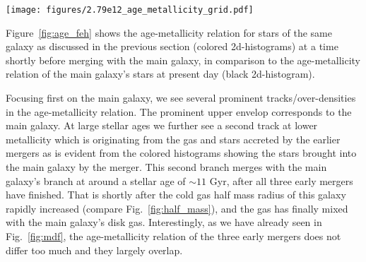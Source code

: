 \documentclass[useAMS,usenatbib]{mnras}
\begin{document}
\begin{figure*}
    \begin{centering}
        \texttt{[image: figures/2.79e12\_age\_metallicity\_grid.pdf]}
        \vspace*{-1.75em}
        \caption{
            Age-metallicity relation for the stars in the galaxy g2.79e12 (black histogram in the background). Individual panels show with color where the stars contributed by the merging dwarf galaxies reside in age-metallicity space. The panel titles highlight the cosmic time at which the merger happens, with two different mergers happening at $t = 2.57$ Gyr.
        }
        \label{fig:age_feh}
    \end{centering}
\end{figure*}

Figure~\ref{fig:age_feh} shows the age-metallicity relation for stars of the same galaxy as discussed in the previous section (colored 2d-histograms) at a time shortly before merging with the main galaxy, in comparison to the age-metallicity relation of the main galaxy's stars at present day (black 2d-histogram).

Focusing first on the main galaxy, we see several prominent tracks/over-densities in the age-metallicity relation. The prominent upper envelop corresponds to the main galaxy. At large stellar ages we further see a second track at lower metallicity which is originating from the gas and stars accreted by the earlier mergers as is evident from the colored histograms showing the stars brought into the main galaxy by the merger. This second branch merges with the main galaxy's branch at around a stellar age of $\sim11$ Gyr, after all three early mergers have finished. That is shortly after the cold gas half mass radius of this galaxy rapidly increased (compare Fig.~\ref{fig:half_mass}), and the gas has finally mixed with the main galaxy's disk gas. Interestingly, as we have already seen in Fig.~\ref{fig:mdf}, the age-metallicity relation of the three early mergers does not differ too much and they largely overlap.
\end{document}

